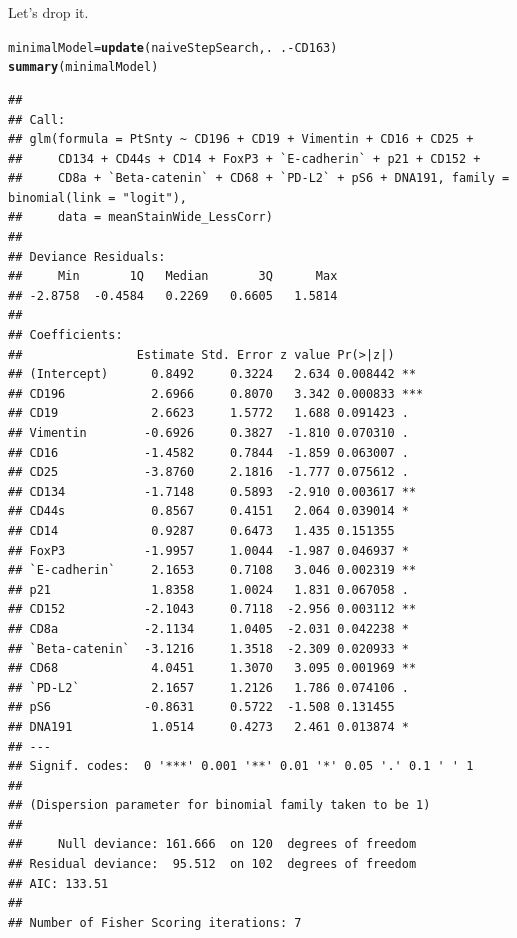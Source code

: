 \documentclass[a4paper]{article}\usepackage[]{graphicx}\usepackage[]{color}
\makeatletter
\newcommand{\hlopt}[1]{\textcolor[rgb]{0,0,0}{#1}}%
\newcommand{\hlstd}[1]{\textcolor[rgb]{0.345,0.345,0.345}{#1}}%
\newcommand{\hlkwb}[1]{\textcolor[rgb]{0.69,0.353,0.396}{#1}}%
\newcommand{\hlkwd}[1]{\textcolor[rgb]{0.737,0.353,0.396}{\textbf{#1}}}%
\newenvironment{kframe}{%
 \def\at@end@of@kframe{}%
 \ifinner\ifhmode%
  \def\at@end@of@kframe{\end{minipage}}%
  \begin{minipage}{\columnwidth}%
 \fi\fi%
 \def\FrameCommand##1{\hskip\@totalleftmargin \hskip-\fboxsep
 \colorbox{shadecolor}{##1}\hskip-\fboxsep
     \hskip-\linewidth \hskip-\@totalleftmargin \hskip\columnwidth}%
 \MakeFramed {\advance\hsize-\width
   \@totalleftmargin\z@ \linewidth\hsize
   \@setminipage}}%
 {\par\unskip\endMakeFramed%
 \at@end@of@kframe}
\newenvironment{knitrout}{}{} %
\makeatother
\begin{document}
Let's drop it.
\begin{knitrout}
\color{fgcolor}\begin{kframe}
\begin{alltt}
\hlstd{minimalModel} \hlkwb{=} \hlkwd{update}\hlstd{(naiveStepSearch,.}\hlopt{~}\hlstd{.}\hlopt{-}\hlstd{CD163)}
\hlkwd{summary}\hlstd{(minimalModel)}
\end{alltt}
\begin{verbatim}
## 
## Call:
## glm(formula = PtSnty ~ CD196 + CD19 + Vimentin + CD16 + CD25 + 
##     CD134 + CD44s + CD14 + FoxP3 + `E-cadherin` + p21 + CD152 + 
##     CD8a + `Beta-catenin` + CD68 + `PD-L2` + pS6 + DNA191, family = binomial(link = "logit"), 
##     data = meanStainWide_LessCorr)
## 
## Deviance Residuals: 
##     Min       1Q   Median       3Q      Max  
## -2.8758  -0.4584   0.2269   0.6605   1.5814  
## 
## Coefficients:
##                Estimate Std. Error z value Pr(>|z|)    
## (Intercept)      0.8492     0.3224   2.634 0.008442 ** 
## CD196            2.6966     0.8070   3.342 0.000833 ***
## CD19             2.6623     1.5772   1.688 0.091423 .  
## Vimentin        -0.6926     0.3827  -1.810 0.070310 .  
## CD16            -1.4582     0.7844  -1.859 0.063007 .  
## CD25            -3.8760     2.1816  -1.777 0.075612 .  
## CD134           -1.7148     0.5893  -2.910 0.003617 ** 
## CD44s            0.8567     0.4151   2.064 0.039014 *  
## CD14             0.9287     0.6473   1.435 0.151355    
## FoxP3           -1.9957     1.0044  -1.987 0.046937 *  
## `E-cadherin`     2.1653     0.7108   3.046 0.002319 ** 
## p21              1.8358     1.0024   1.831 0.067058 .  
## CD152           -2.1043     0.7118  -2.956 0.003112 ** 
## CD8a            -2.1134     1.0405  -2.031 0.042238 *  
## `Beta-catenin`  -3.1216     1.3518  -2.309 0.020933 *  
## CD68             4.0451     1.3070   3.095 0.001969 ** 
## `PD-L2`          2.1657     1.2126   1.786 0.074106 .  
## pS6             -0.8631     0.5722  -1.508 0.131455    
## DNA191           1.0514     0.4273   2.461 0.013874 *  
## ---
## Signif. codes:  0 '***' 0.001 '**' 0.01 '*' 0.05 '.' 0.1 ' ' 1
## 
## (Dispersion parameter for binomial family taken to be 1)
## 
##     Null deviance: 161.666  on 120  degrees of freedom
## Residual deviance:  95.512  on 102  degrees of freedom
## AIC: 133.51
## 
## Number of Fisher Scoring iterations: 7
\end{verbatim}
\end{kframe}
\end{knitrout}
\end{document}
